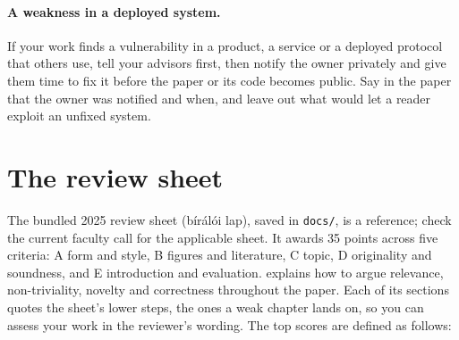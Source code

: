 \paragraph{A weakness in a deployed system.} If your work finds a vulnerability in a product, a service or a deployed protocol that others use, tell your advisors first, then notify the owner privately and give them time to fix it before the paper or its code becomes public. Say in the paper that the owner was notified and when, and leave out what would let a reader exploit an unfixed system.

\section{The review sheet}\label{guide:tdk:sheet}
The bundled 2025 review sheet (bírálói lap), saved in \texttt{docs/}, is a reference; check the current faculty call for the applicable sheet. It awards 35 points across five criteria: A form and style, B figures and literature, C topic, D originality and soundness, and E introduction and evaluation.  explains how to argue relevance, non-triviality, novelty and correctness throughout the paper. Each of its sections quotes the sheet's lower steps, the ones a weak chapter lands on, so you can assess your work in the reviewer's wording. The top scores are defined as follows:
